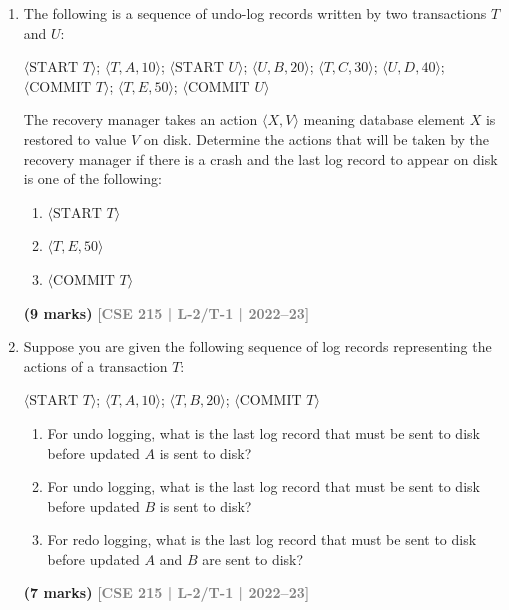 \documentclass[12pt]{article}
\newcommand{\yr}[1]{\hfill\textcolor{gray}{\small\textbf{[#1]}}}
\newcommand{\mk}[1]{\textcolor{orange!70!black}{\small\textbf{(#1 marks)}}}
\begin{document}
\begin{enumerate}
\item The following is a sequence of undo-log records written by two transactions $T$ and $U$:
\begin{center}
\small\ttfamily
$\langle\text{START } T\rangle$; $\langle T, A, 10\rangle$; $\langle\text{START } U\rangle$; $\langle U, B, 20\rangle$; $\langle T, C, 30\rangle$; $\langle U, D, 40\rangle$; $\langle\text{COMMIT } T\rangle$; $\langle T, E, 50\rangle$; $\langle\text{COMMIT } U\rangle$
\end{center}
The recovery manager takes an action $\langle X, V\rangle$ meaning database element $X$ is restored to value $V$ on disk. Determine the actions that will be taken by the recovery manager if there is a crash and the last log record to appear on disk is one of the following:
\begin{enumerate}
  \item $\langle\text{START } T\rangle$
  \item $\langle T, E, 50\rangle$
  \item $\langle\text{COMMIT } T\rangle$
\end{enumerate}
  \mk{9} \yr{CSE 215 | L-2/T-1 | 2022--23}


\item Suppose you are given the following sequence of log records representing the actions of a transaction $T$:
\begin{center}
\small\ttfamily
$\langle\text{START } T\rangle$; $\langle T, A, 10\rangle$; $\langle T, B, 20\rangle$; $\langle\text{COMMIT } T\rangle$
\end{center}
\begin{enumerate}
  \item For undo logging, what is the last log record that must be sent to disk before updated $A$ is sent to disk?
  \item For undo logging, what is the last log record that must be sent to disk before updated $B$ is sent to disk?
  \item For redo logging, what is the last log record that must be sent to disk before updated $A$ and $B$ are sent to disk?
\end{enumerate}
\mk{7} \yr{CSE 215 | L-2/T-1 | 2022--23}



\end{enumerate}
\end{document}
